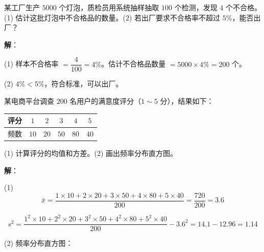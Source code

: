 \documentclass[12pt, a4paper]{ctexart}
\begin{document}
\begin{appbox}[【应用1】灯泡质量检测]
某工厂生产 $5000$ 个灯泡，质检员用系统抽样抽取 $100$ 个检测，发现 $4$ 个不合格。
(1) 估计这批灯泡中不合格品的数量。(2) 若出厂要求不合格率不超过 $5\%$，能否出厂？
\end{appbox}

\textbf{解}：

(1) 样本不合格率 $= \dfrac{4}{100} = 4\%$。估计不合格品数量 $= 5000 \times 4\% = 200$ 个。

(2) $4\% < 5\%$，符合标准，可以出厂。

\begin{appbox}[【应用2】电商平台满意度调查]
某电商平台调查 $200$ 名用户的满意度评分（$1 \sim 5$ 分），结果如下：

\begin{center}
\begin{tabular}{cccccc}
\toprule
评分 & $1$ & $2$ & $3$ & $4$ & $5$ \\
\midrule
频数 & $10$ & $20$ & $50$ & $80$ & $40$ \\
\bottomrule
\end{tabular}
\end{center}

(1) 计算评分的均值和方差。(2) 画出频率分布直方图。
\end{appbox}

\textbf{解}：

(1)
\[
\bar{x} = \frac{1\times10 + 2\times20 + 3\times50 + 4\times80 + 5\times40}{200} = \frac{720}{200} = 3.6
\]

\[
s^2 = \frac{1^2\times10 + 2^2\times20 + 3^2\times50 + 4^2\times80 + 5^2\times40}{200} - 3.6^2 = 14.1 - 12.96 = 1.14
\]

(2) 频率分布直方图：

\begin{center}
\end{center}
\end{document}
